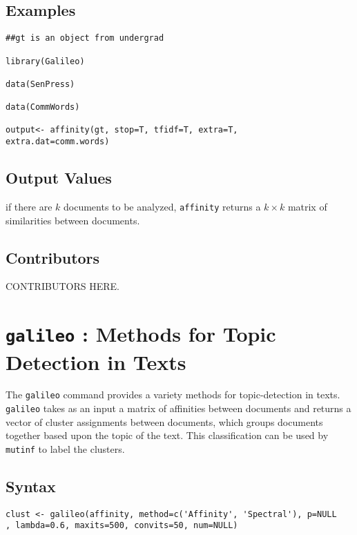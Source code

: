 \documentclass[12pt,letterpaper]{article}
\begin{document}
\subsection*{Examples}
\begin{verbatim}
##gt is an object from undergrad

library(Galileo)

data(SenPress)

data(CommWords)

output<- affinity(gt, stop=T, tfidf=T, extra=T,
extra.dat=comm.words)

\end{verbatim}

\subsection*{Output Values}
if there are $k$ documents to be analyzed, {\tt affinity} returns a
$k \times k$ matrix of similarities between documents.


\subsection*{Contributors}
CONTRIBUTORS HERE.


\clearpage


\section*{{\tt galileo} : Methods for Topic Detection in Texts}
\label{galileo} The {\tt galileo} command provides a variety methods
for topic-detection in texts.  {\tt galileo} takes as an input a
matrix of affinities between documents and returns a vector of
cluster assignments between documents, which groups documents
together based upon the topic of the text.  This classification can
be used by {\tt mutinf} to label the clusters.
\subsection*{Syntax}
\begin{verbatim}
clust <- galileo(affinity, method=c('Affinity', 'Spectral'), p=NULL
, lambda=0.6, maxits=500, convits=50, num=NULL)
\end{verbatim}
\end{document}
